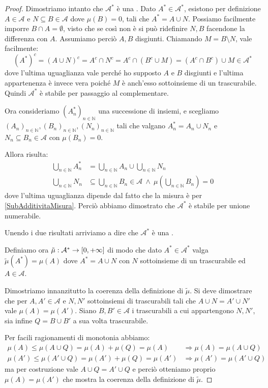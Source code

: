 \begin{proof}
	Dimostriamo intanto che $\mathcal A^*$ è una \sigalg{}.
	Dato $A^*\in\mathcal A^*$, esistono per definizione $A\in\mathcal A$ e $N\subseteq B\in\mathcal A$ dove $\mu(B)=0$, tali che $A^*=A\cup N$. Possiamo facilmente imporre $B\cap A=\emptyset$, visto che se così non è si può ridefinire $N,B$ facendone la differenza con $A$. Assumiamo perciò $A,B$ disgiunti.
	Chiamando $M=B\setminus N$, vale facilmente:
	\begin{equation*}
		(A^*)^c=(A\cup N)^c=A^c\cap N^c=A^c\cap(B^c\cup M)=(A^c\cap B^c )\cup M \in\mathcal A^*
	\end{equation*}
	dove l'ultima uguaglianza vale perché ho supposto $A$ e $B$ disgiunti e l'ultima appartenenza è invece vera poiché $M$ è anch'esso sottoinsieme di un trascurabile. Quindi $\mathcal A^*$ è stabile per passaggio al complementare.
	
	Ora consideriamo $(A^*_n)_{n\in\mathbb N}$ una successione di insiemi, e scegliamo $(A_n)_{n\in\mathbb N},(B_n)_{n\in\mathbb N},(N_n)_{n\in\mathbb N}$ tali che valgano $A^*_n=A_n\cup N_n$ e $N_n\subseteq B_n\in\mathcal A$ con $\mu(B_n)=0$.
	
	Allora risulta:
	\begin{align*}
		\bigcup_{n\in\mathbb N}A^*_n &=\bigcup_{n\in\mathbb N}A_n \cup \bigcup_{n\in\mathbb N}N_n\\
		\bigcup_{n\in\mathbb N}N_n &\subseteq \bigcup_{n\in\mathbb N}B_n\in\mathcal A\ \wedge\ \mu\left(\bigcup_{n\in\mathbb N}B_n\right)=0
	\end{align*}
	dove l'ultima uguaglianza dipende dal fatto che la misura è \sigsubadd{} per \cref{SubAdditivitaMisura}. Perciò abbiamo dimostrato che $\mathcal A^*$ è stabile per unione numerabile.
	
	Unendo i due risultati arriviamo a dire che $\mathcal A^*$ è una \sigalg{}.
	
	Definiamo ora $\tilde\mu:\mathcal A^*\to[0,+\infty]$ di modo che dato $A^*\in\mathcal A^*$ valga $\tilde\mu(A^*)=\mu(A)$ dove $A^*=A\cup N$ con $N$ sottoinsieme di un trascurabile ed $A\in\mathcal A$.
	
	Dimostriamo innanzitutto la coerenza della definizione di $\tilde\mu$. Si deve dimostrare che per $A,A'\in\mathcal A$ e $N,N'$ sottoinsiemi di trascurabili tali che $A\cup N=A'\cup N'$ vale $\mu(A)=\mu(A')$. Siano $B,B'\in\mathcal A$ i trascurabili a cui appartengono $N,N'$, sia infine $Q=B\cup B'$ a sua volta trascurabile.
	
	Per facili ragionamenti di monotonia abbiamo:
	\begin{align*}
		\mu(A)\le \mu(A\cup Q) =\mu(A)+\mu(Q)=\mu(A) &\Longrightarrow \mu(A)=\mu(A\cup Q)\\
		\mu(A')\le \mu(A'\cup Q) =\mu(A')+\mu(Q)=\mu(A') &\Longrightarrow \mu(A')=\mu(A'\cup Q)
	\end{align*}
	ma per costruzione vale $A\cup Q=A'\cup Q$ e perciò otteniamo proprio $\mu(A)=\mu(A')$ che mostra la coerenza della definizione di $\tilde\mu$.
	

\end{proof}
